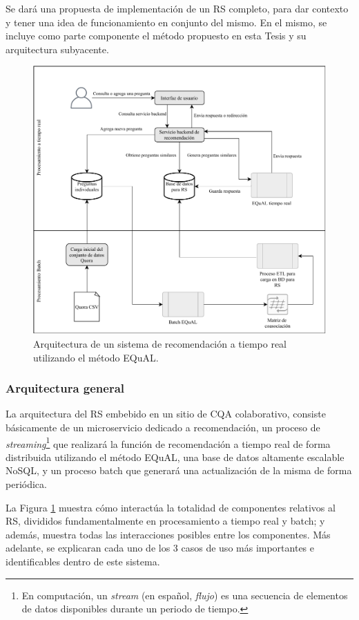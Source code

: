 \bigskip Se dará una propuesta de implementación de un RS completo, para dar contexto y tener una idea de funcionamiento en conjunto del mismo. En el mismo, se incluye como parte componente el método propuesto en esta Tesis y su arquitectura subyacente.

\bigskip
\begin{figure}[h!]
	\centering
	\includegraphics[width=0.9\linewidth]{8_problema_investigacion/imagenes/implementacion_rs}
	\caption{Arquitectura de un sistema de recomendación a tiempo real utilizando el método EQuAL.}
	\label{fig:implementacionrs}
\end{figure}

\subsubsection{Arquitectura general}
La arquitectura del RS embebido en un sitio de CQA colaborativo, consiste básicamente de un microservicio dedicado a recomendación, un proceso de \textit{streaming}\footnote{En computación, un \textit{stream} (en español, \textit{flujo}) es una secuencia de elementos de datos disponibles durante un periodo de tiempo.} que realizará la función de recomendación a tiempo real de forma distribuida utilizando el método EQuAL, una base de datos altamente escalable NoSQL, y un proceso batch que generará una actualización de la misma de forma periódica.

La Figura \ref{fig:implementacionrs} muestra cómo interactúa la totalidad de componentes relativos al RS, divididos fundamentalmente en procesamiento a tiempo real y batch; y además, muestra todas las interacciones posibles entre los componentes. Más adelante, se explicaran cada uno de los 3 casos de uso más importantes e identificables dentro de este sistema.

